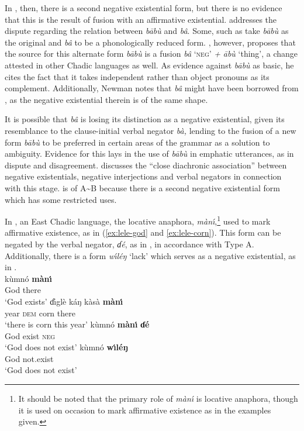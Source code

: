 \documentclass[output=paper]{langsci/langscibook}
\begin{document}
In , then, there is a second negative existential form, but there is no evidence that this is the result of fusion with an affirmative existential. \citet{Newman2000} addresses the dispute regarding the relation between \textit{b\=ab\`u} and \textit{bâ}. Some, such as \citet{Eulenberg1971} take \textit{b\=ab\`u} as the original and \textit{bâ} to be a phonologically reduced form.  \citet{Newman1971}, however, proposes that the source for this alternate form \textit{bābù} is a fusion \textit{bâ} `\textsc{neg}' \textit{+} \textit{\=ab\`u} `thing', a change attested in other Chadic languages as well. As evidence against \textit{b\=ab\`u} as basic, he cites the fact that it takes independent rather than object pronouns as its complement. Additionally, Newman notes that \textit{bâ} might have been borrowed from , as the negative existential therein is of the same shape. 

It is possible that \textit{bâ} is losing its distinction as a negative
existential, given its resemblance to the clause-initial verbal negator
\textit{bà,} lending to the fusion of a new form \textit{b\=ab\`u} to be
preferred in certain areas of the grammar as a solution to ambiguity.
Evidence for this lays in the use of \textit{b\=ab\`u} in emphatic
utterances, as in dispute and disagreement. \citet{Croft1991} discusses
the ``close diachronic association'' between negative existentials,
negative interjections and verbal negators in connection with this stage.
 is of A{\textasciitilde}B because there is a second negative
existential form which has some restricted uses.

In , an East Chadic language, the locative anaphora,
\textit{m\`an\'\i},\footnote{It should be noted that the primary role of
\textit{m\`an\'\i} is locative anaphora, though it is used on occasion to
mark affirmative existence as in the examples given.} used to mark
affirmative existence, as in (\ref{ex:lele-god} and \ref{ex:lele-corn}). This
form can be negated by the verbal negator, \textit{ɗ\'e}, as in
, in accordance with Type A. Additionally, there is a
form \textit{w{\'\i}l\'eŋ} `lack' which serves as a negative existential,
as in .  
\ea\label{ex:lele-god-corn-no-god}
\\ 
\ea\label{ex:lele-god}
\gll k\`umn\'o \textbf{m\`an\'\i}\\ God there\\ 
\glt `God exists'
\ex\label{ex:lele-corn} 
\gll ɗ{\'\i}gl\`e k\'aŋ k\`as\`a
\textbf{m\`an\'\i}\\ year \textsc{dem} corn there\\ 
\glt `there is corn this year' 
\ex\label{ex:lele-no-god} 
\gll k\`umn\'o \textbf{m\`an\'\i} \textbf{ɗ\'e}\\ 
God exist \textsc{neg}\\ 
\glt `God does not exist'
\ex\label{ex:lele-still-no-god} 
\gll k\`umn\'o \textbf{w{\'\i}l\'eŋ}\\ 
God {not.exist}\\ 
\glt `God does not exist' \z\z
\end{document}
